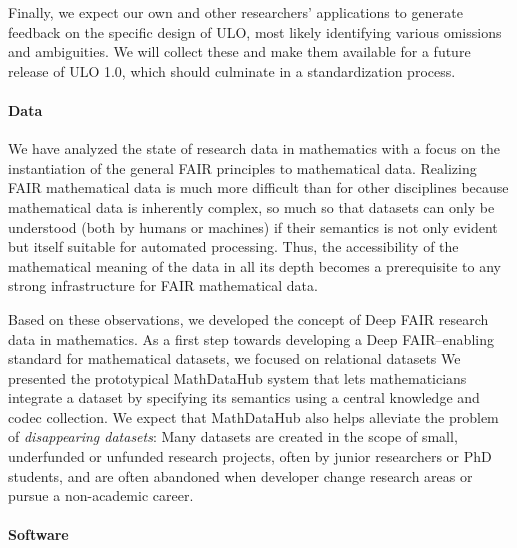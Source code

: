 Finally, we expect our own and other researchers' applications to generate feedback on the specific design of ULO, most likely identifying various omissions and ambiguities.
We will collect these and make them available for a future release of ULO 1.0, which should culminate in a standardization process.

\paragraph{Data}
We have analyzed the state of research data in mathematics with a focus on the instantiation of the general FAIR principles to mathematical data.
Realizing FAIR mathematical data is much more difficult than for other disciplines because mathematical data is inherently complex, so much so that datasets can only be understood (both by humans or machines) if their semantics is not only evident but itself suitable for automated processing.
Thus, the accessibility of the mathematical meaning of the data in all its depth becomes a prerequisite to any strong infrastructure for FAIR mathematical data.

Based on these observations, we developed the concept of Deep FAIR research data in mathematics.
As a first step towards developing a Deep FAIR--enabling standard for mathematical datasets, we focused on relational datasets
We presented the prototypical MathDataHub system that lets mathematicians integrate a dataset by specifying its semantics using a central knowledge and codec collection.
We expect that MathDataHub also helps alleviate the problem of \emph{disappearing datasets}:
Many datasets are created in the scope of small, underfunded or unfunded research projects, often by junior researchers or PhD students, and are often abandoned when developer change research areas or pursue a non-academic career.

\paragraph{Software}


